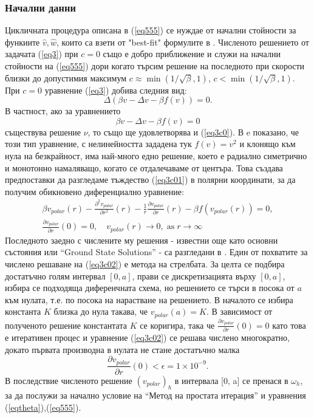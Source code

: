 \documentclass[a4paper]{article}
\newcommand{\be}{\begin{equation}}
\newcommand{\ee}{\end{equation}}
\newcommand{\rf}[1]{(\ref{#1})}
\theoremstyle{remark}
\begin{document}
\subsubsection{Начални данни}
 Цикличната процедура описана в \rf{eq555} се нуждае от начални стойности за функиите $\widehat{v},\widehat{w}$, които са взети от "best-fit" формулите в \cite{Ch2011}. 
Численото решението от задачата \rf{eq3} при $c=0$ също е добро приближение и служи на начални стойности на \rf{eq555} дори когато търсим решение на последното при скорости близки до допустимия максимум $c \approx \min (1/ \sqrt{\beta},1)$, $c < \min (1/ \sqrt{\beta},1)$. При $c=0$ уравнение \rf{eq3} добива следния вид:
\be\label{eq3c0}
\Delta (\beta  v - \Delta v - \beta f(v)) = 0.
\ee
В частност, ако за уравнението 
\be\label{eq3c01}
\beta v - \Delta v - \beta f(v) = 0
\ee
съществува решение $\nu$, то също ще удовлетворява и \rf{eq3c0}.  В \cite{ref1c00} e показано, че този тип уравнение, с нелинейността зададена тук $f(v) = v^2$ и клонящо към нула на безкрайност, има най-много едно решение, което е радиално симетрично и монотонно намаляващо, когато се отдалечаваме от центъра. Това създава предпоставки да разгледаме тъждество \rf{eq3c01} в полярни координати, за да получим обикновено диференциално уравнение:
\begin{align}\label{eq3c02}
\beta v_{polar}(r)  - \frac{ \partial^2 v_{polar} } {\partial r^2}(r) - \frac{1}{r} \frac{ \partial v_{polar} } {\partial r}(r)  - \beta f(v_{polar}(r)) = 0, \nonumber \\
\frac{ \partial v_{polar} } {\partial r}(0) = 0, \quad v_{polar}(r) \rightarrow 0, \; \text{as} \; r \rightarrow \infty
\end{align}
Последното заедно с числените му решения - известни още като основни състояния или ``Ground State Solutions'' - са разгледани в \cite{ref1c0, ref2c0}. Един от похватите за числено решаване на \rf{eq3c02} е метода на стрелбата. За целта се подбира достатъчно голям интервал $[0, a]$, прави се дискретизацията върху $[0, a]$, избира се подходяща диференчната схема, но решението се търси в посока от $a$ към нулата, т.е. по посока на нарастване на решението. В началото се избира константа $K$ близка до нула такава, че $v_{polar}(a) = K$. В зависимост от полученото решение константата $K$ се коригира, така че $\frac{ \partial v_{polar} } {\partial r}(0) = 0$ като това е итеративен процес и уравнение \rf{eq3c02} се решава числено многократно, докато първата производна в нулата не стане достатъчно малка $$\frac{ \partial v_{polar} } {\partial r}(0) < \epsilon = 1\times10^{-9}.$$ В последствие численото решение $(v_{polar})_h$ в интервала [0, a] се пренася в $\omega_h$, за да послужи за начално условие на ``Метод на простата итерация'' и уравнения \rf{eqtheta},\rf{eq555}.
\end{document}
